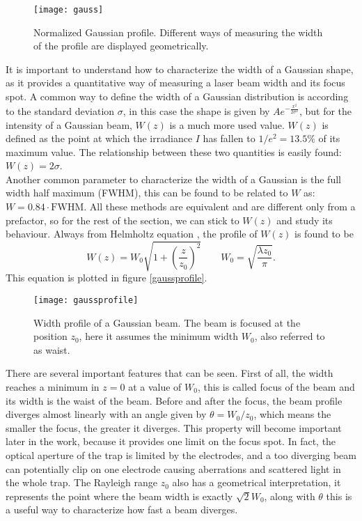 \begin{figure}
\centering
\texttt{[image: gauss]}
\caption{Normalized Gaussian profile. Different ways of measuring the width of the profile are displayed geometrically.}
\label{gauss}
\end{figure}
It is important to understand how to characterize the width of a Gaussian shape, as it provides a quantitative way of measuring a laser beam width and its focus spot. A common way to define the width of a Gaussian distribution is according to the standard deviation $\sigma$, in this case the shape is given by $Ae^{-\frac{x^2}{2\sigma^2}}$, but for the intensity of a Gaussian beam, $W(z)$ is a much more used value. $W(z)$ is defined as the point at which the irradiance $I$ has fallen to $1/e^2 = 13.5\%$ of its maximum value. The relationship between these two quantities is easily found: $W(z) = 2\sigma$.\\
Another common parameter to characterize the width of a Gaussian is the full width half maximum (FWHM), this can be found to be related to $W$ as: $W = 0.84\cdot \text{FWHM}$. All these methods are equivalent and are different only from a prefactor, so for the rest of the section, we can stick to $W(z)$ and study its behaviour. Always from Helmholtz equation \cite{saleh}, the profile of $W(z)$ is found to be
\begin{equation}
W(z) = W_0 \sqrt{1 + \left(\frac{z}{z_0}\right)^2}\qquad W_0 = \sqrt{\frac{\lambda z_0}{\pi}}.
\end{equation}
This equation is plotted in figure \eqref{gaussprofile}.
\begin{figure}
\centering
\texttt{[image: gaussprofile]}
\caption{Width profile of a Gaussian beam. The beam is focused at the position $z_0$, here it assumes the minimum width $W_0$, also referred to as waist.}
\label{gaussprofile}
\end{figure}
There are several important features that can be seen. First of all, the width reaches a minimum in $z=0$ at a value of $W_0$, this is called focus of the beam and its width is the waist of the beam. Before and after the focus, the beam profile diverges almost linearly with an angle given by $\theta = W_0/z_0$, which means the smaller the focus, the greater it diverges. This property will become important later in the work, because it provides one limit on the focus spot. In fact, the optical aperture of the trap is limited by the electrodes, and a too diverging beam can potentially clip on one electrode causing aberrations and scattered light in the whole trap.  The Rayleigh range $z_0$ also has a geometrical interpretation, it represents the point where the beam width is exactly $\sqrt{2}W_0$, along with $\theta$ this is a useful way to characterize how fast a beam diverges.\\

